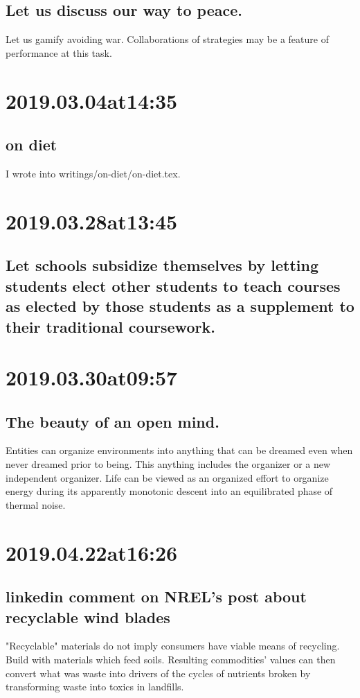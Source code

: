\subsection*{ Let us discuss our way to peace. }
Let us gamify avoiding war.
Collaborations of strategies may be a feature of performance at this task.

\section*{ 2019.03.04at14:35 }
\subsection*{ on diet }
I wrote into writings/on-diet/on-diet.tex.

\section*{ 2019.03.28at13:45 }
\subsection*{ Let schools subsidize themselves by letting students elect other students to teach courses as elected by those students as a supplement to their traditional coursework. }

\section*{ 2019.03.30at09:57 }
\subsection*{ The beauty of an open mind. }
Entities can organize environments into anything that can be dreamed even when never dreamed prior to being.
This anything includes the organizer or a new independent organizer.
Life can be viewed as an organized effort to organize energy during its apparently monotonic descent into an equilibrated phase of thermal noise.

\section*{ 2019.04.22at16:26 }
\subsection*{ linkedin comment on NREL's post about recyclable wind blades }
"Recyclable" materials do not imply consumers have viable means of recycling. Build with materials which feed soils. Resulting commodities' values can then convert what was waste into drivers of the cycles of nutrients broken by transforming waste into toxics in landfills.

